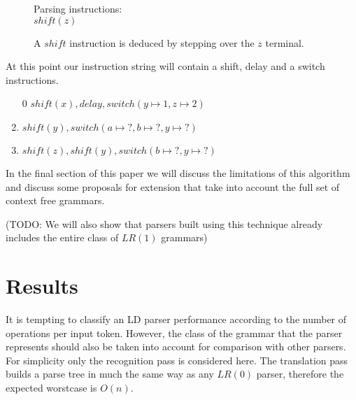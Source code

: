 \documentclass[a4paper,11pt]{article}
\begin{document}
\begin{figure}[!ht]
\begin{center}
\parbox{.3\textwidth}{}
\parbox{.65\textwidth}{Parsing instructions:\\$shift(z)$}
\caption{A $shift$ instruction is deduced by stepping over the $z$ terminal.}
\end{center}
\end{figure}

At this point our instruction string will contain a shift, delay and a switch instructions.
\begin{enumerate}
\item[0] $shift(x), delay, switch(y \mapsto 1, z \mapsto 2)$\\
\item $shift(y), switch(a \mapsto ?, b \mapsto ?, y \mapsto ?)$\\
\item $shift(z), shift(y), switch(b \mapsto ?, y \mapsto ?)$
\end{enumerate}

In the final section of this paper we will discuss the limitations of this algorithm and discuss some proposals for extension that take into account the full set of context free grammars. 

(TODO: We will also show that parsers built using this technique already includes the entire class of $LR(1)$ grammars)

\section*{Results}

It is tempting to classify an LD parser performance according to the number of operations per input token.
However, the class of the grammar that the parser represents should also be taken into account for comparison with other parsers.
For simplicity only the recognition pass is considered here. 
The translation pass builds a parse tree in much the same way as any $LR(0)$ parser, therefore the expected worstcase is $O(n)$.
\end{document}
